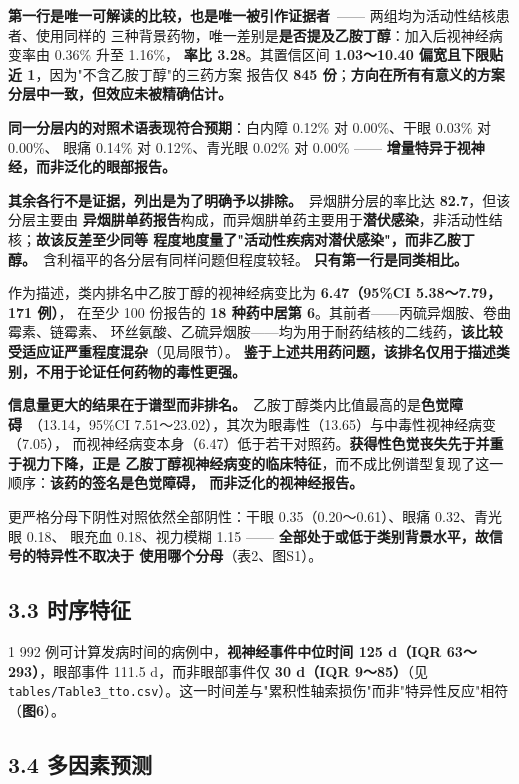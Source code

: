 \documentclass[UTF8,fontset=windows,11pt]{ctexart}
\begin{document}
\textbf{第一行是唯一可解读的比较，也是唯一被引作证据者}\ —— 两组均为活动性结核患者、使用同样的 三种背景药物，唯一差别是\textbf{是否提及乙胺丁醇}：加入后视神经病变率由 0.36\% 升至 1.16\%， \textbf{率比 3.28}。其置信区间 \textbf{1.03～10.40 偏宽且下限贴近 1}，因为"不含乙胺丁醇"的三药方案 报告仅 \textbf{845 份}；\textbf{方向在所有有意义的方案分层中一致，但效应未被精确估计。}

\textbf{同一分层内的对照术语表现符合预期}：白内障 0.12\% 对 0.00\%、干眼 0.03\% 对 0.00\%、 眼痛 0.14\% 对 0.12\%、青光眼 0.02\% 对 0.00\% —— \textbf{增量特异于视神经，而非泛化的眼部报告。}

\textbf{其余各行不是证据，列出是为了明确予以排除。}\ 异烟肼分层的率比达 \textbf{82.7}，但该分层主要由 \textbf{异烟肼单药报告}构成，而异烟肼单药主要用于\textbf{潜伏感染}，非活动性结核；\textbf{故该反差至少同等 程度地度量了"活动性疾病对潜伏感染"，而非乙胺丁醇。}\ 含利福平的各分层有同样问题但程度较轻。 \textbf{只有第一行是同类相比。}

作为描述，类内排名中乙胺丁醇的视神经病变比为 \textbf{6.47（95\%CI 5.38～7.79，171 例）}， 在至少 100 份报告的 \textbf{18 种药中居第 6}。其前者——丙硫异烟胺、卷曲霉素、链霉素、 环丝氨酸、乙硫异烟胺——均为用于耐药结核的二线药，\textbf{该比较受适应证严重程度混杂}（见局限节）。 \textbf{鉴于上述共用药问题，该排名仅用于描述类别，不用于论证任何药物的毒性更强。}

\textbf{信息量更大的结果在于谱型而非排名。}\ 乙胺丁醇类内比值最高的是\textbf{色觉障碍}\ （13.14，95\%CI 7.51～23.02），其次为眼毒性（13.65）与中毒性视神经病变（7.05）， 而视神经病变本身（6.47）低于若干对照药。\textbf{获得性色觉丧失先于并重于视力下降，正是 乙胺丁醇视神经病变的临床特征}，而不成比例谱型复现了这一顺序：\textbf{该药的签名是色觉障碍， 而非泛化的视神经报告。}

更严格分母下阴性对照依然全部阴性：干眼 0.35（0.20～0.61）、眼痛 0.32、青光眼 0.18、 眼充血 0.18、视力模糊 1.15 —— \textbf{全部处于或低于类别背景水平，故信号的特异性不取决于 使用哪个分母}（表2、图S1）。

\subsection{3.3 时序特征}

1 992 例可计算发病时间的病例中，\textbf{视神经事件中位时间 125 d（IQR 63～293）}，眼部事件 111.5 d，而非眼部事件仅 \textbf{30 d（IQR 9～85）}（见 \texttt{tables/Table3\_tto.csv}）。这一时间差与"累积性轴索损伤"而非"特异性反应"相符（\textbf{图6}）。

\subsection{3.4 多因素预测}
\end{document}
